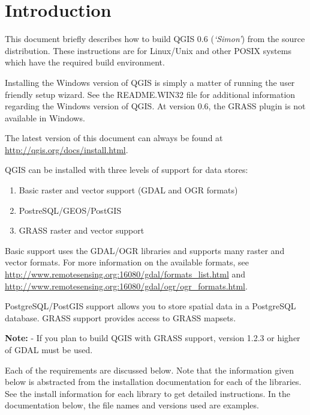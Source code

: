 
\section{Introduction}\label{label_introduction}
This document briefly describes how to build QGIS 0.6 (\textit{`Simon'}) from the source distribution. These instructions are for Linux/Unix and other POSIX systems which have the required build environment.


Installing the Windows version of QGIS is simply a matter of running the user friendly setup wizard. See the README.WIN32 file for additional information regarding the Windows version of QGIS. At version 0.6, the GRASS plugin is not available in Windows.




The latest version of this document can always be found at \url{http://qgis.org/docs/install.html}.

QGIS can be installed with three levels of support for data stores:
\begin{enumerate}
\item Basic raster and vector support (GDAL and OGR formats)
\item PostreSQL/GEOS/PostGIS 
\item GRASS raster and vector support
\end{enumerate} 

Basic support uses the GDAL/OGR libraries and supports many raster and vector formats. For more information on the available formats, see \url{http://www.remotesensing.org:16080/gdal/formats\_list.html} and \url{http://www.remotesensing.org:16080/gdal/ogr/ogr\_formats.html}.

PostgreSQL/PostGIS support allows you to store spatial data in a PostgreSQL database. GRASS support provides access to GRASS mapsets. 

\textbf{Note:} - If you plan to build QGIS with GRASS support, version 1.2.3 or higher of GDAL must be used. 
  
Each of the requirements are discussed below. Note that the information given below is abstracted from the installation documentation for each of the libraries. See the install information for each library to get detailed instructions. In the documentation below, the file names and versions used are examples.


